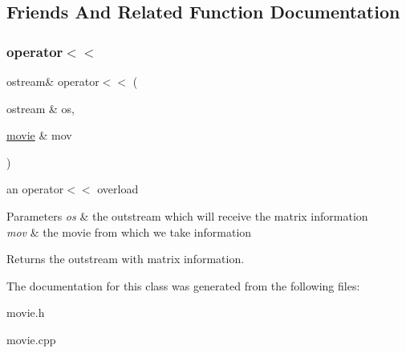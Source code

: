 \subsection{Friends And Related Function Documentation}
\mbox{\label{classmovie_aa8ad90df626e5f76c1140feccdd9d1db}} 
\subsubsection{\texorpdfstring{operator$<$$<$}{operator<<}}
{\footnotesize\ttfamily ostream\& operator$<$$<$ (\begin{DoxyParamCaption}\item[{ostream \&}]{os,  }\item[{\hyperlink{classmovie}{movie} \&}]{mov }\end{DoxyParamCaption})\hspace{0.3cm}{\ttfamily [friend]}}



an operator$<$$<$ overload 


\begin{DoxyParams}{Parameters}
{\em os} & the outstream which will receive the matrix information \\
\hline
{\em mov} & the movie from which we take information \\
\hline
\end{DoxyParams}
\begin{DoxyReturn}{Returns}
the outstream with matrix information. 
\end{DoxyReturn}


The documentation for this class was generated from the following files\+:\begin{DoxyCompactItemize}
\item 
movie.\+h\item 
movie.\+cpp\end{DoxyCompactItemize}
